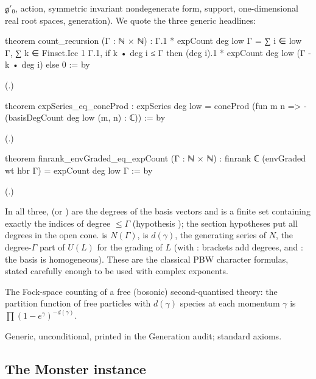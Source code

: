 $\mathfrak g'_0$, action, symmetric invariant nondegenerate form, support, one-dimensional real root spaces, generation).  We
quote the three generic headlines:
\begin{leancode}
theorem count_recursion (Γ : ℕ × ℕ) :
    Γ.1 * expCount deg low Γ =
      ∑ i ∈ low Γ, ∑ k ∈ Finset.Icc 1 Γ.1,
        if k • deg i ≤ Γ then (deg i).1 * expCount deg low (Γ - k • deg i) else 0 := by
\end{leancode}
(.)
\begin{leancode}
theorem expSeries_eq_coneProd :
    expSeries deg low = coneProd (fun m n => -(basisDegCount deg low (m, n) : ℂ)) := by
\end{leancode}
(.)
\begin{leancode}
theorem finrank_envGraded_eq_expCount (Γ : ℕ × ℕ) :
    finrank ℂ (envGraded wt hbr Γ) = expCount deg low Γ := by
\end{leancode}
(.)
\begin{dictionary}
In all three,  (or ) are the degrees of the basis vectors and  is a
finite set containing exactly the indices of degree $\le\Gamma$ (hypothesis ); the section hypotheses
 put all degrees in the open cone.   is $N(\Gamma)$,
 is $d(\gamma)$,  the generating series of $N$,  the
degree-$\Gamma$ part of $U(L)$ for the grading  of $L$ (with : brackets add degrees, and : the
basis is homogeneous).  These are the classical PBW character formulas, stated carefully enough to be used with complex
exponents.
\end{dictionary}
\begin{physics}
The Fock-space counting of a free (bosonic) second-quantised theory: the partition function of free particles with $d(\gamma)$
species at each momentum $\gamma$ is $\prod(1-e^\gamma)^{-d(\gamma)}$.
\end{physics}
\begin{status}
Generic, unconditional, printed in the Generation audit; standard axioms.
\end{status}

\subsection{The Monster instance}\label{ch20:sec:genmonster}

